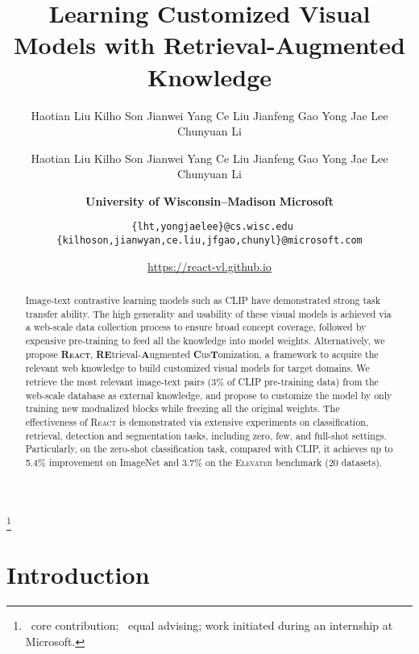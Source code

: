 \documentclass[10pt,twocolumn,letterpaper]{article}
\newcommand\blfootnote[1]{\begingroup
  \renewcommand\thefootnote{}\footnote{#1}\addtocounter{footnote}{-1}\endgroup
}
\newcommand{\shortname}{\textsc{React}}
\newcommand{\longname}{\textbf{RE}trieval-\textbf{A}ugmented \textbf{C}us\textbf{T}omization}
\begin{document}
\title{Learning Customized Visual Models with Retrieval-Augmented Knowledge}

\author{Haotian Liu \quad Kilho Son \quad Jianwei Yang \quad Ce Liu \quad Jianfeng Gao \quad Yong Jae Lee\textsuperscript{} \quad Chunyuan Li\textsuperscript{}
}


\author{
\normalsize{
    Haotian Liu \quad Kilho Son \quad Jianwei Yang \quad Ce Liu \quad Jianfeng Gao \quad Yong Jae Lee\textsuperscript{} \quad Chunyuan Li\textsuperscript{}
}
\and
{
\normalsize
 \textbf{University of Wisconsin--Madison}
\quad\quad\quad
 \textbf{Microsoft} \;
}
\and
\centerline{\tt\footnotesize  
\{lht,yongjaelee\}@cs.wisc.edu 
 \ \{kilhoson,jianwyan,ce.liu,jfgao,chunyl\}@microsoft.com
}
\and
\centerline{\normalsize \url{https://react-vl.github.io}
}
}
\maketitle

\begin{abstract}

Image-text contrastive learning models such as CLIP have demonstrated strong task transfer ability. 
The high generality and usability of these visual models  is achieved via a web-scale data collection process to ensure broad concept coverage, followed by expensive pre-training to feed all the knowledge into model weights. 
Alternatively, we propose \textbf{\shortname{}}, \longname{}, a framework to acquire the relevant web knowledge to build customized visual models for target domains.
We retrieve the most relevant image-text pairs (3\% of CLIP pre-training data) from the web-scale database as external knowledge, and propose to customize the model by only training new modualized blocks while freezing all the original weights.
The effectiveness of \shortname{} is demonstrated via extensive experiments on classification, retrieval, detection and segmentation tasks, including zero, few, and full-shot settings.
Particularly, on the zero-shot classification task, compared with CLIP, it achieves up to 5.4\% improvement on ImageNet and 3.7\% on the \textsc{Elevater} benchmark (20 datasets).

\end{abstract}


\blfootnote{~core contribution; ~equal advising;  work initiated during an internship at Microsoft.}

\section{Introduction}
\label{sec:intro}
\end{document}
